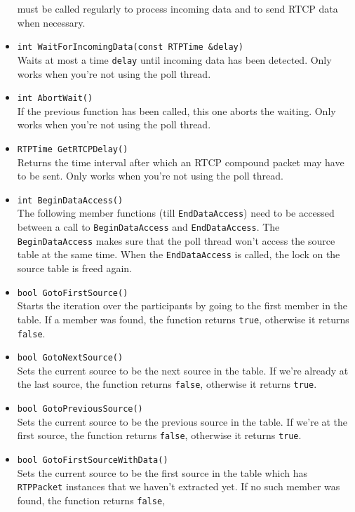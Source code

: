\documentclass[12pt,a4paper]{article}
\begin{document}
\begin{itemize}
						must be called regularly to process incoming data
						and to send RTCP data when necessary.
					\item {\tt int WaitForIncomingData(const RTPTime \&delay)}\\
						Waits at most a time {\tt delay} until incoming data has
						been detected. Only works when you're not using the poll
						thread.
					\item {\tt int AbortWait()}\\
						If the previous function has been called, this one aborts
						the waiting. Only works when you're not using the poll
						thread.
					\item {\tt RTPTime GetRTCPDelay()}\\
						Returns the time interval after which an RTCP compound
						packet may have to be sent. Only works when you're not using
						the poll thread.
					\item {\tt int BeginDataAccess()}\\
						The following member functions (till {\tt EndDataAccess})
						need to be accessed between a call to {\tt BeginDataAccess}
						and {\tt EndDataAccess}. The {\tt BeginDataAccess} makes
						sure that the poll thread won't access the source table
						at the same time. When the {\tt EndDataAccess} is called,
						the lock on the source table is freed again.
					\item {\tt bool GotoFirstSource()}\\
						Starts the iteration over the participants by going to the
						first member in the table. If a member was found, the function
						returns {\tt true}, otherwise it returns {\tt false}.
					\item {\tt bool GotoNextSource()}\\
						Sets the current source to be the next source in the table.
						If we're already at the last source, the function returns
						{\tt false}, otherwise it returns {\tt true}.
					\item {\tt bool GotoPreviousSource()}\\
						Sets the current source to be the previous source in the table.
						If we're at the first source, the function returns
						{\tt false}, otherwise it returns {\tt true}.
					\item {\tt bool GotoFirstSourceWithData()}\\
						Sets the current source to be the first source in the table
						which has {\tt RTPPacket} instances that we haven't extracted
						yet. If no such member was found, the function returns {\tt false},

\end{itemize}
\end{document}

